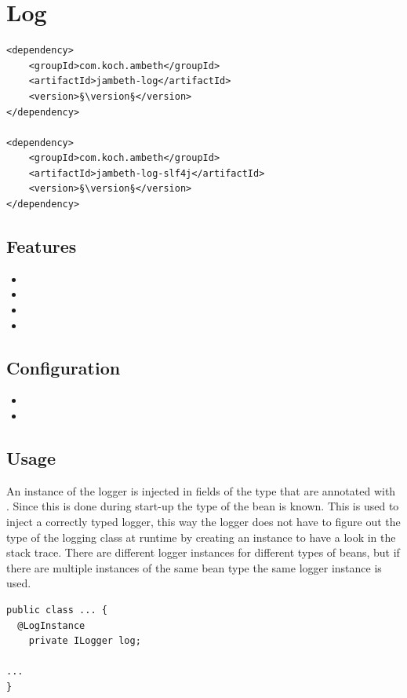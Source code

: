 \section{Log}
\label{module:Log}
\ClearAPI
\TODO
\begin{lstlisting}[style=POM,caption={Maven modules to use \emph{Ambeth Log}}]
<dependency>
	<groupId>com.koch.ambeth</groupId>
	<artifactId>jambeth-log</artifactId>
	<version>§\version§</version>
</dependency>

<dependency>
	<groupId>com.koch.ambeth</groupId>
	<artifactId>jambeth-log-slf4j</artifactId>
	<version>§\version§</version>
</dependency>
\end{lstlisting}
\subsection{Features}
\begin{itemize}
	\item {}
	\item {}
	\item {}
	\item {}
\end{itemize}

\subsection{Configuration}
\begin{itemize}
	\item {}
	\item {}
\end{itemize}

\subsection{Usage}
An instance of the \AMBETH logger is injected in fields of the type  that are annotated with . Since this is done during start-up the type of the bean is known. This is used to inject a correctly typed logger, this way the logger does not have to figure out the type of the logging class at runtime by creating an  instance to have a look in the stack trace. There are different logger instances for different types of beans, but if there are multiple instances of the same bean type the same logger instance is used.

\begin{lstlisting}[style=Java,caption={Example of a logger injection field}]
public class ... {
  @LogInstance
	private ILogger log;

...
}
\end{lstlisting}
